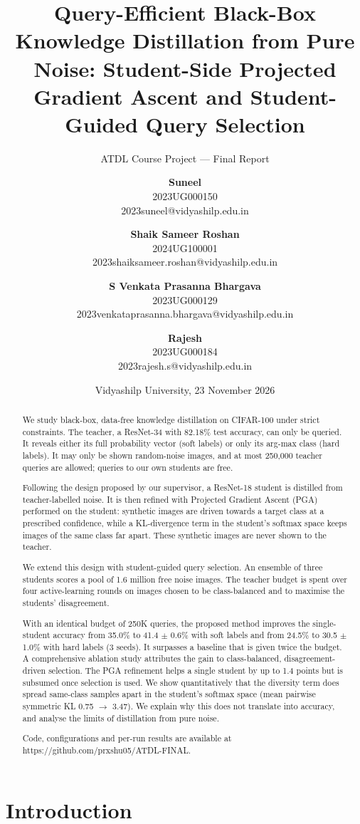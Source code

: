 \documentclass[
  10pt,
]{article}
\title{Query-Efficient Black-Box Knowledge Distillation from Pure Noise:
Student-Side Projected Gradient Ascent and Student-Guided Query
Selection}
\subtitle{ATDL Course Project --- Final Report}
\author{\textbf{Suneel}\\
2023UG000150\\
2023suneel@vidyashilp.edu.in \and \textbf{Shaik Sameer Roshan}\\
2024UG100001\\
2023shaiksameer.roshan@vidyashilp.edu.in \and \textbf{S Venkata Prasanna
Bhargava}\\
2023UG000129\\
2023venkataprasanna.bhargava@vidyashilp.edu.in \and \textbf{Rajesh}\\
2023UG000184\\
2023rajesh.s@vidyashilp.edu.in}
\date{Vidyashilp University, 23 November 2026}
\begin{document}
\maketitle
\begin{abstract}
We study black-box, data-free knowledge distillation on CIFAR-100 under
strict constraints. The teacher, a ResNet-34 with 82.18\% test accuracy,
can only be queried. It reveals either its full probability vector (soft
labels) or only its arg-max class (hard labels). It may only be shown
random-noise images, and at most 250,000 teacher queries are allowed;
queries to our own students are free.

Following the design proposed by our supervisor, a ResNet-18 student is
distilled from teacher-labelled noise. It is then refined with Projected
Gradient Ascent (PGA) performed on the student: synthetic images are
driven towards a target class at a prescribed confidence, while a
KL-divergence term in the student's softmax space keeps images of the
same class far apart. These synthetic images are never shown to the
teacher.

We extend this design with student-guided query selection. An ensemble
of three students scores a pool of 1.6 million free noise images. The
teacher budget is spent over four active-learning rounds on images
chosen to be class-balanced and to maximise the students' disagreement.

With an identical budget of 250K queries, the proposed method improves
the single-student accuracy from 35.0\% to 41.4 \(\pm\) 0.6\% with soft
labels and from 24.5\% to 30.5 \(\pm\) 1.0\% with hard labels (3 seeds).
It surpasses a baseline that is given twice the budget. A comprehensive
ablation study attributes the gain to class-balanced,
disagreement-driven selection. The PGA refinement helps a single student
by up to 1.4 points but is subsumed once selection is used. We show
quantitatively that the diversity term does spread same-class samples
apart in the student's softmax space (mean pairwise symmetric KL 0.75
\(\to\) 3.47). We explain why this does not translate into accuracy, and
analyse the limits of distillation from pure noise.

Code, configurations and per-run results are available at
https://github.com/prxshu05/ATDL-FINAL.
\end{abstract}

\hypertarget{introduction}{%
\section{Introduction}\label{introduction}}
\end{document}
